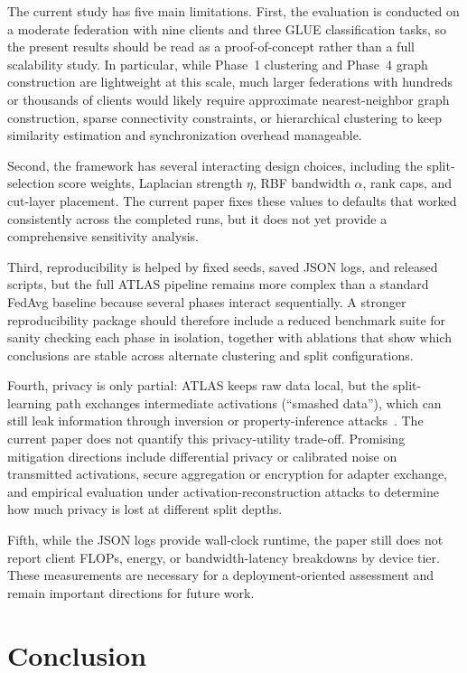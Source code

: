 \documentclass[conference]{IEEEtran}
\begin{document}
The current study has five main limitations. First, the evaluation is conducted on a moderate federation with nine clients and three GLUE classification tasks, so the present results should be read as a proof-of-concept rather than a full scalability study. In particular, while Phase~1 clustering and Phase~4 graph construction are lightweight at this scale, much larger federations with hundreds or thousands of clients would likely require approximate nearest-neighbor graph construction, sparse connectivity constraints, or hierarchical clustering to keep similarity estimation and synchronization overhead manageable.

Second, the framework has several interacting design choices, including the split-selection score weights, Laplacian strength $\eta$, RBF bandwidth $\alpha$, rank caps, and cut-layer placement. The current paper fixes these values to defaults that worked consistently across the completed runs, but it does not yet provide a comprehensive sensitivity analysis.

Third, reproducibility is helped by fixed seeds, saved JSON logs, and released scripts, but the full ATLAS pipeline remains more complex than a standard FedAvg baseline because several phases interact sequentially. A stronger reproducibility package should therefore include a reduced benchmark suite for sanity checking each phase in isolation, together with ablations that show which conclusions are stable across alternate clustering and split configurations.

Fourth, privacy is only partial: ATLAS keeps raw data local, but the split-learning path exchanges intermediate activations (``smashed data''), which can still leak information through inversion or property-inference attacks~\cite{splitfed,vflair_llm}. The current paper does not quantify this privacy-utility trade-off. Promising mitigation directions include differential privacy or calibrated noise on transmitted activations, secure aggregation or encryption for adapter exchange, and empirical evaluation under activation-reconstruction attacks to determine how much privacy is lost at different split depths.

Fifth, while the JSON logs provide wall-clock runtime, the paper still does not report client FLOPs, energy, or bandwidth-latency breakdowns by device tier. These measurements are necessary for a deployment-oriented assessment and remain important directions for future work.

\section{Conclusion}
\label{sec:conclusion}
\end{document}
